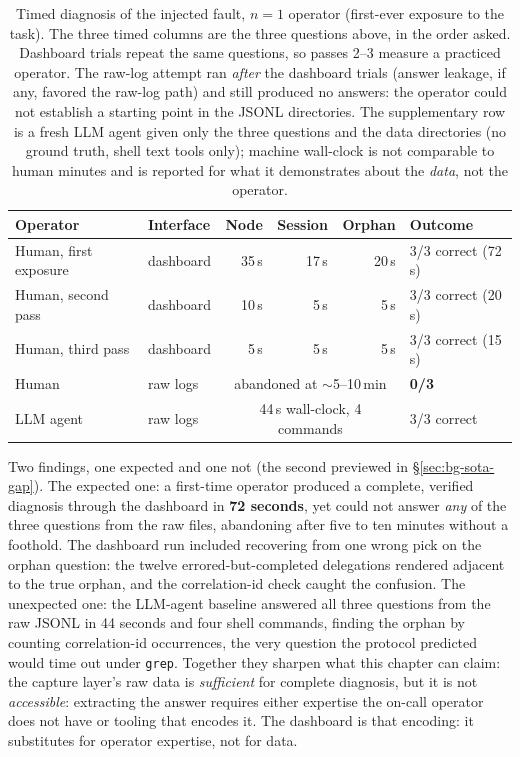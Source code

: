 \begin{table}[h]
\centering
\small
\begin{tabular}{@{}llrrrl@{}}
\toprule
\textbf{Operator} & \textbf{Interface} & \textbf{Node} &
\textbf{Session} & \textbf{Orphan} & \textbf{Outcome} \\
\midrule
Human, first exposure & dashboard & 35\,s & 17\,s & 20\,s & 3/3 correct (72\,s) \\
Human, second pass    & dashboard & 10\,s & 5\,s  & 5\,s  & 3/3 correct (20\,s) \\
Human, third pass     & dashboard & 5\,s  & 5\,s  & 5\,s  & 3/3 correct (15\,s) \\
Human                 & raw logs  & \multicolumn{3}{c}{abandoned at ${\sim}$5--10\,min} & \textbf{0/3} \\
LLM agent             & raw logs  & \multicolumn{3}{c}{44\,s wall-clock, 4 commands} & 3/3 correct \\
\bottomrule
\end{tabular}
\caption[Timed diagnosis of the injected fault]{Timed diagnosis of the injected fault, $n{=}1$ operator
(first-ever exposure to the task). The three timed columns are the
three questions above, in the order asked. Dashboard trials repeat the same
questions, so passes 2--3 measure a practiced operator. The raw-log
attempt ran \emph{after} the dashboard trials (answer leakage, if
any, favored the raw-log path) and still produced no answers: the
operator could not establish a starting point in the JSONL directories.
The supplementary row is a fresh LLM agent given only the three
questions and the data directories (no ground truth, shell text tools
only); machine wall-clock is not comparable to human minutes and is
reported for what it demonstrates about the \emph{data}, not the
operator.}
\label{tab:casestudy}
\end{table}

Two findings, one expected and one not (the second previewed in
\S\ref{sec:bg-sota-gap}). The expected one: a first-time operator
produced a complete, verified diagnosis through the dashboard in
\textbf{72 seconds}, yet could not answer \emph{any} of the three
questions from the raw files, abandoning after five to ten minutes
without a foothold. The dashboard run included recovering from one
wrong pick on the orphan question: the twelve errored-but-completed delegations
rendered adjacent to the true orphan, and the correlation-id check
caught the confusion. The unexpected one: the LLM-agent baseline
answered all three questions from the raw JSONL in 44 seconds and four
shell commands, finding the orphan by counting correlation-id
occurrences, the very question the protocol predicted would time out
under \texttt{grep}. Together they sharpen what this chapter can
claim: the capture layer's raw data is \emph{sufficient} for
complete diagnosis, but it is not \emph{accessible}: extracting the
answer requires either expertise the on-call operator does not have or
tooling that encodes it. The dashboard is that encoding: it substitutes
for operator expertise, not for data.

